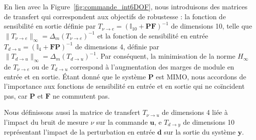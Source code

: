 En lien avec la Figure~\ref{fig:commande_int6DOF}, nous introduisons des matrices de transfert qui correspondent aux objectifs de robustesse : la fonction de sensibilité en sortie définie par $T_{\nu \rightarrow e}=(\mathbb{I}_{10}+\boldsymbol{P}\boldsymbol{F})^{-1}$ de dimensions 10, telle que $\lVert T_{\nu \rightarrow e} \rVert _{\infty}=\Delta_m(T_{\nu \rightarrow e})^{-1} $ et la fonction de sensibilité en entrée $T_{d \rightarrow u}=(\mathbb{I}_{4}+\boldsymbol{F}\boldsymbol{P})^{-1}$ de dimensions 4, définie par $\lVert T_{d \rightarrow u} \rVert _{\infty}=\Delta_m(T_{d \rightarrow u})^{-1}$.
Par conséquent, la minimisation de la norme $H_{\infty}$ de $T_{\nu \rightarrow e}$ ou de $T_{d \rightarrow u}$ correspond à l'augmentation des marges de module en entrée et en sortie. Étant donné que le système $\boldsymbol{P}$ est MIMO, nous accordons de l'importance aux fonctions de sensibilité en entrée et en sortie qui ne coïncident pas, car $\boldsymbol{P}$ et $\boldsymbol{F}$ ne commutent pas.

Nous définissons aussi la matrice de transfert $T_{\nu \rightarrow u}$ de dimensions 4 liée à l'impact du bruit de mesure $\nu$ sur la commande $\boldsymbol{u}$, e $T_{d \rightarrow y}$ de dimensions 10 représentant l'impact de la perturbation en entrée $\boldsymbol{d}$ sur la sortie du système $\boldsymbol{y}$. 

